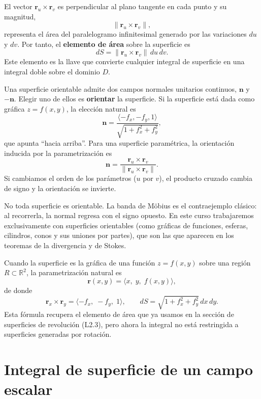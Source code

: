 El vector $\mathbf{r}_u \times \mathbf{r}_v$ es perpendicular al plano tangente en cada punto y su magnitud,
\[
\|\mathbf{r}_u \times \mathbf{r}_v\|,
\]
representa el área del paralelogramo infinitesimal generado por las variaciones $du$ y $dv$. Por tanto, el \textbf{elemento de área} sobre la superficie es
\[
dS = \|\mathbf{r}_u \times \mathbf{r}_v\|\,du\,dv.
\]
Este elemento es la llave que convierte cualquier integral de superficie en una integral doble sobre el dominio $D$.

\begin{definition}
Una superficie orientable admite dos campos normales unitarios continuos, $\mathbf{n}$ y $-\mathbf{n}$. Elegir uno de ellos es \textbf{orientar} la superficie. Si la superficie está dada como gráfica $z = f(x,y)$, la elección natural es
\[
\mathbf{n} = \frac{\langle -f_x, -f_y, 1 \rangle}{\sqrt{1+f_x^2+f_y^2}},
\]
que apunta ``hacia arriba''. Para una superficie paramétrica, la orientación inducida por la parametrización es
\[
\mathbf{n} = \frac{\mathbf{r}_u \times \mathbf{r}_v}{\|\mathbf{r}_u \times \mathbf{r}_v\|}.
\]
Si cambiamos el orden de los parámetros ($u$ por $v$), el producto cruzado cambia de signo y la orientación se invierte.
\end{definition}

\begin{rem}
No toda superficie es orientable. La banda de Möbius es el contraejemplo clásico: al recorrerla, la normal regresa con el signo opuesto. En este curso trabajaremos exclusivamente con superficies orientables (como gráficas de funciones, esferas, cilindros, conos y sus uniones por partes), que son las que aparecen en los teoremas de la divergencia y de Stokes.
\end{rem}

Cuando la superficie es la gráfica de una función $z = f(x,y)$ sobre una región $R\subset\mathbb{R}^2$, la parametrización natural es
\[
\mathbf{r}(x,y) = \langle x,\; y,\; f(x,y) \rangle,
\]
de donde
\[
\mathbf{r}_x \times \mathbf{r}_y = \langle -f_x,\; -f_y,\; 1 \rangle,
\qquad
dS = \sqrt{1+f_x^2+f_y^2}\,dx\,dy.
\]
Esta fórmula recupera el elemento de área que ya usamos en la sección de superficies de revolución (L2.3), pero ahora la integral no está restringida a superficies generadas por rotación.

\section{Integral de superficie de un campo escalar}

